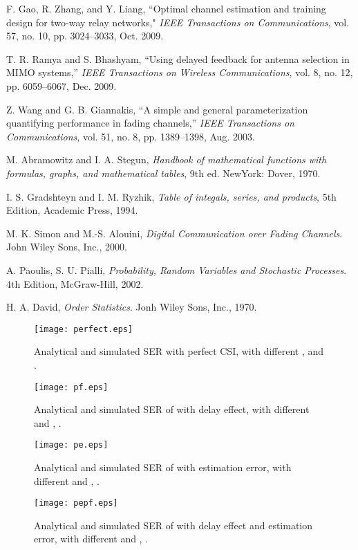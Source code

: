 \documentclass[onecolumn,letterpaper,11pt,draftclsnofoot]{IEEEtran}
\begin{document}
\begin{thebibliography}{1}
F. Gao, R. Zhang, and Y. Liang, ``Optimal channel
estimation and training design for two-way relay networks,"
\emph{IEEE Transactions on Communications}, vol. 57, no. 10, pp.
3024--3033, Oct. 2009.

T. R. Ramya and S. Bhashyam, ``Using delayed feedback for antenna
selection in MIMO systems,'' \emph{IEEE Transactions on Wireless
Communications}, vol. 8, no. 12, pp. 6059--6067, Dec. 2009.

Z. Wang and G. B. Giannakis, ``A simple and general parameterization quantifying performance in fading
channels,'' \emph{IEEE Transactions on Communications}, vol. 51, no.
8, pp. 1389--1398, Aug. 2003.


 M. Abramowitz and I. A. Stegun, \emph{Handbook of mathematical functions with formulas, graphs, and mathematical tables}, 9th ed.
    NewYork: Dover, 1970.

 I. S. Gradshteyn and I. M. Ryzhik, \emph{Table of integals, series, and products}, 5th Edition, Academic Press, 1994.

M. K. Simon and M.-S. Alouini, \emph{Digital Communication over Fading
Channels}. John Wiley  Sons, Inc., 2000.

 A. Paoulis, S. U. Pialli, \emph{Probability, Random Variables and Stochastic
Processes}. 4th Edition, McGraw-Hill, 2002.

 H. A. David, \emph{Order Statistics}. Jonh Wiley  Sons, Inc., 1970.

\end{thebibliography}


\newpage

\begin{figure}[h!]
\centering
\texttt{[image: perfect.eps]}
\caption{Analytical and simulated SER with perfect CSI, with
different ,  and .}
\label{fig:4}
\end{figure}

\begin{figure}[h!]
\centering
\texttt{[image: pf.eps]}
\caption{Analytical and simulated SER of  with delay effect,
with different  and , .} \label{fig:1}
\end{figure}

\begin{figure}[h!]
\centering
\texttt{[image: pe.eps]}
\caption{Analytical and simulated SER of  with estimation
error, with different  and ,
.} \label{fig:2}
\end{figure}

\begin{figure}[h!]
\centering
\texttt{[image: pepf.eps]}
\caption{Analytical and simulated SER of  with delay effect and
estimation error, with different  and , .}
\label{fig:3}
\end{figure}
\end{document}
